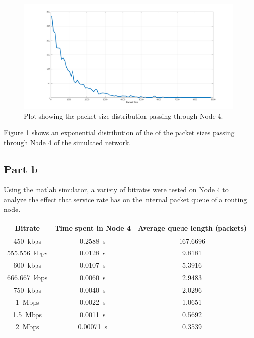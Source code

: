 \documentclass[12pt,letterpaper]{article}
\begin{document}
\begin{figure}[h!]
\centering
\includegraphics[width=5.5in]{figure1.png}
\caption{Plot showing the packet size distribution passing through Node 4.}
\label{fig:pa}
\end{figure}

Figure \ref{fig:pa} shows an exponential distribution of the of the packet
sizes passing through Node 4 of the simulated network.

\subsection*{Part b}

Using the matlab simulator, a variety of bitrates were tested on Node 4 to analyze the
effect that service rate has on the internal packet queue of a routing node.

\pagebreak

\begin{table}[h!]
    \renewcommand{\arraystretch}{1.3}
    \setlength{\tabcolsep}{12pt}
    \begin{center}
        \begin{tabular}{|c|c|c|}\hline
        Bitrate & Time spent in Node 4 & Average queue length (packets)\\\hline
        \SI{450}{kbps} & \SI{0.2588}{s} & 167.6696 \\\hline
        \SI{555.556}{kbps} & \SI{0.0128}{s} & 9.8181 \\\hline
        \SI{600}{kbps} & \SI{0.0107}{s} & 5.3916 \\\hline
        \SI{666.667}{kbps} & \SI{0.0060}{s} & 2.9483 \\\hline
        \SI{750}{kbps} & \SI{0.0040}{s} & 2.0296 \\\hline
        \SI{1}{Mbps} & \SI{0.0022}{s} & 1.0651 \\\hline
        \SI{1.5}{Mbps} & \SI{0.0011}{s} & 0.5692 \\\hline
        \SI{2}{Mbps} & \SI{0.00071}{s} & 0.3539 \\\hline
        \end{tabular}
    \end{center}
    \label{tab:tim}
\end{table}
\end{document}
